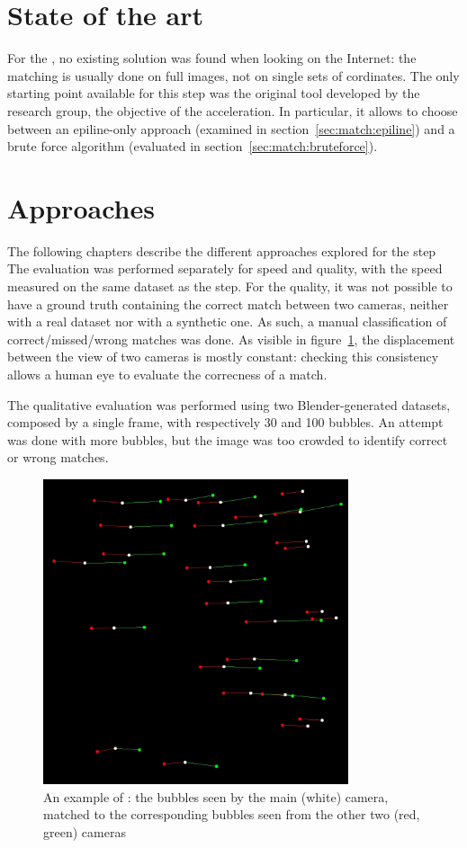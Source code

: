 \section{State of the art}

For the \match*, no existing solution was found when looking on the Internet: the matching is usually done on full images, not on single sets of cordinates.
The only starting point available for this step was the original tool developed by the research group, the objective of the acceleration.
In particular, it allows to choose between an epiline-only approach (examined in section~\ref{sec:match:epiline}) and a brute force algorithm (evaluated in section~\ref{sec:match:bruteforce}).

\section{Approaches}

The following chapters describe the different approaches explored for the \match* step
The evaluation was performed separately for speed and quality, with the speed measured on the same dataset as the \linkDD* step.
For the quality, it was not possible to have a ground truth containing the correct match between two cameras, neither with a real dataset nor with a synthetic one.
As such, a manual classification of correct/missed/wrong matches was done.
As visible in figure~\ref{fig:match:example}, the displacement between the view of two cameras is mostly constant: checking this consistency allows a human eye to evaluate the correcness of a match.

The qualitative evaluation was performed using two Blender-generated datasets, composed by a single frame, with respectively 30 and 100 bubbles.
An attempt was done with more bubbles, but the image was too crowded to identify correct or wrong matches.

\begin{figure}[H]
	\centerline{\includegraphics[width=0.8\textwidth]{images/match-observation.png}}
	\caption{\centering An example of \match*: the bubbles seen by the main (white) camera, matched to the corresponding bubbles seen from the other two (red, green) cameras}
	\label{fig:match:example}
\end{figure}

